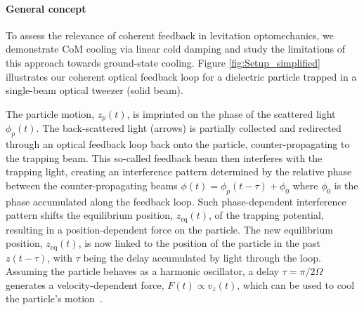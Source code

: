 \documentclass[reprint,aps,prl,superscriptaddress]{revtex4-2}
\begin{document}
\paragraph{General concept}
To assess the relevance of coherent feedback in levitation optomechanics, we demonstrate CoM cooling via linear cold damping and study the limitations of this approach towards ground-state cooling. %
Figure \ref{fig:Setup_simplified} illustrates our coherent optical feedback loop for a dielectric particle trapped in a single-beam optical tweezer (solid beam). 


The particle motion, $z_p(t)$, is imprinted on the phase of the scattered light $\phi_p(t)$. %
The back-scattered light (arrows) is partially collected and redirected through an optical feedback loop back onto the particle, counter-propagating to the trapping beam. This so-called feedback beam then interferes with the trapping light, %
creating an interference pattern determined by the relative phase between the counter-propagating beams $\phi(t) = \phi_p(t-\tau) + \phi_0$ where $\phi_0$ is the phase accumulated along the feedback loop. %
Such phase-dependent interference pattern shifts the equilibrium position, $z_\text{eq}(t)$, of the trapping potential, resulting in a position-dependent force on the particle. %
The new equilibrium position, $z_\text{eq}(t)$, is now linked to the position of the particle in the past $z(t-\tau)$, with $\tau$ being the delay accumulated by light through the loop. Assuming the particle behaves as a harmonic oscillator, a delay $\tau=\pi/2\Omega$ generates a velocity-dependent force, $F(t) \propto v_z(t)$, which can be used to cool the particle's motion~\cite{conangla2019optimal,tebbenjohanns2019cold,Vijayan2023-all-optical-scalable-CD}.
\end{document}
